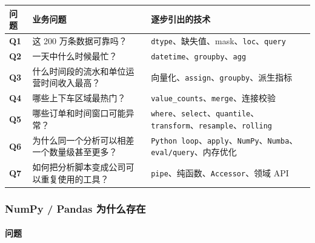 \documentclass[11pt]{article}
\begin{document}
{\def\LTcaptype{none} %
\begin{longtable}[]{@{}
  >{\raggedright\arraybackslash}p{}
  >{\raggedright\arraybackslash}p{}
  >{\raggedright\arraybackslash}p{}@{}}
\toprule\noalign{}
\begin{minipage}[b]{\linewidth}\raggedright
问题
\end{minipage} & \begin{minipage}[b]{\linewidth}\raggedright
业务问题
\end{minipage} & \begin{minipage}[b]{\linewidth}\raggedright
逐步引出的技术
\end{minipage} \\
\midrule\noalign{}
\endhead
\bottomrule\noalign{}
\endlastfoot
\textbf{Q1} & 这 200 万条数据可靠吗？ &
\texttt{dtype}、缺失值、mask、\texttt{loc}、\texttt{query} \\
\textbf{Q2} & 一天中什么时候最忙？ &
\texttt{datetime}、\texttt{groupby}、\texttt{agg} \\
\textbf{Q3} & 什么时间段的流水和单位运营时间收入最高？ &
向量化、\texttt{assign}、\texttt{groupby}、派生指标 \\
\textbf{Q4} & 哪些上下车区域最热门？ &
\texttt{value\_counts}、\texttt{merge}、连接校验 \\
\textbf{Q5} & 哪些订单和时间窗口可能异常？ &
\texttt{where}、\texttt{select}、\texttt{quantile}、\texttt{transform}、\texttt{resample}、\texttt{rolling} \\
\textbf{Q6} & 为什么同一个分析可以相差一个数量级甚至更多？ &
\texttt{Python\ loop}、\texttt{apply}、\texttt{NumPy}、\texttt{Numba}、\texttt{eval/query}、内存优化 \\
\textbf{Q7} & 如何把分析脚本变成公司可以重复使用的工具？ &
\texttt{pipe}、纯函数、\texttt{Accessor}、领域 API \\
\end{longtable}
}

\subsubsection{NumPy / Pandas
为什么存在}\label{numpy-pandas-ux4e3aux4ec0ux4e48ux5b58ux5728}

\paragraph{问题}\label{ux95eeux9898}
\end{document}
